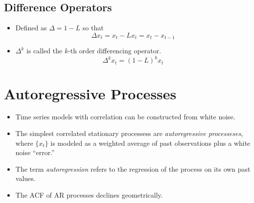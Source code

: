 \documentclass[11pt]{article}
\begin{document}
\subsection{Difference Operators}
\begin{itemize}
    \item Defined as $\Delta = 1 - L$ so that 
    \[\Delta x_t = x_t - L x_t = x_t - x_{t-1}\]
    \item $\Delta^k$ is called the $k$-th order differencing operator. 
    \[\Delta^k x_t = {(1-L)}^k x_t\]
\end{itemize}

\section{Autoregressive Processes}

\begin{itemize}
    \item Time series models with correlation can be constructed from white noise.
    \item The simplest correlated stationary processess are \textit{autoregressive processeses},
    where $\{x_t\}$ is modeled as a weighted average of past observations plus a white noise 
    ``error.''
    \item The term \textit{autoregression} refers to the regression of the process on its own 
    past values. 
    \item The ACF of AR processes declines geometrically.
\end{itemize}
\end{document}
